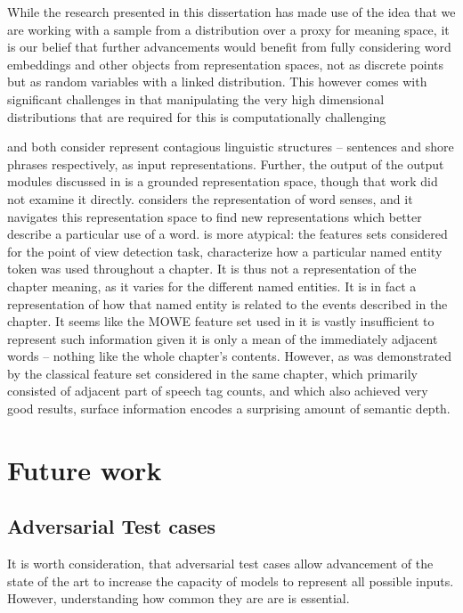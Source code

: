 \documentclass{book}
\begin{document}
While the research presented in this dissertation has made use of the idea that we are working with a sample from a distribution over a proxy for meaning space,
it is our belief that further advancements would benefit from fully considering
word embeddings and other objects from representation spaces, not as discrete points but as random variables with a linked distribution.
This however comes with significant challenges in that manipulating the very high dimensional distributions that are required for this is computationally challenging



 and  both consider represent contagious linguistic structures -- sentences and shore phrases respectively, as input representations.
Further, the output of the output modules discussed in  is a grounded representation space, though that work did not examine it directly.
 considers the representation of word senses, and it navigates this representation space to find new representations which better describe a particular use of a word.
 is more atypical:
the features sets considered for the point of view detection task,
characterize how a particular named entity token was used throughout a chapter.
It is thus not a representation of the chapter meaning, as it varies for the different named entities.
It is in fact a representation of how that named entity is related to the events described in the chapter.
It seems like the MOWE feature set used in  it is vastly insufficient to represent such information given it is only a mean of the immediately adjacent words -- nothing like the whole chapter's contents.
However, as was demonstrated by the classical feature set considered in the same chapter, which primarily consisted of adjacent part of speech tag counts, and which also achieved very good results, surface information encodes a surprising amount of semantic depth.


\section{Future work}

\subsection{Adversarial Test cases}
It is worth consideration,
that adversarial test cases allow advancement of the state of the art to increase the capacity of models to represent all possible inputs.
However, understanding how common they are are is essential.
\end{document}
